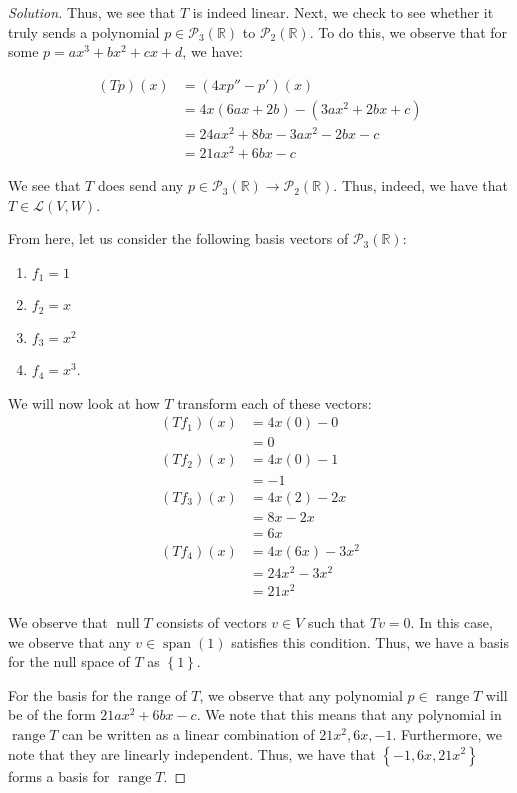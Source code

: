 \documentclass{article}
\newenvironment{solution}{\begin{proof}[Solution]}{\end{proof}}
\newcommand{\RR}{\mathbb{R}}
\DeclareMathOperator*{\vspan}{\mathrm{span}}
\DeclareMathOperator*{\vnull}{\mathrm{null}}
\DeclareMathOperator*{\vrange}{\mathrm{range}}
\begin{document}
\begin{solution}
		Thus, we see that $T$ is indeed linear. Next, we check to see whether it truly sends a polynomial $p \in \mathscr{P}_{3}(\RR)$ to $\mathscr{P}_{2}(\RR)$. To do this, we observe that for some $p = ax^{3} + bx^{2} + cx + d$, we have:
		
		\begin{align*}
			(Tp)(x) &= (4xp'' - p')(x) \\
			&= 4x(6ax + 2b) - (3ax^{2} + 2bx + c) \\
			&= 24ax^{2} + 8bx - 3ax^{2} - 2bx - c \\
			&= 21ax^{2} + 6bx - c
		\end{align*}
		
		We see that $T$ does send any $p \in \mathscr{P}_{3}(\RR) \rightarrow \mathscr{P}_{2}(\RR)$. Thus, indeed, we have that $T \in \mathcal{L}(V,W)$.
		
		From here, let us consider the following basis vectors of $\mathscr{P}_{3}(\RR)$:
		\begin{enumerate}
			\item $f_{1} = 1$
			\item $f_{2} = x$
			\item $f_{3} = x^{2}$
			\item $f_{4} = x^{3}$.
		\end{enumerate}
	
		We will now look at how $T$ transform each of these vectors:
		\begin{align*}
			(Tf_{1})(x) &= 4x(0) - 0 \\
			&= 0 \\
			(Tf_{2}) (x)&= 4x(0) - 1 \\
			&= -1 \\
			(Tf_{3}) (x)&= 4x(2) - 2x \\
			&= 8x - 2x \\
			&= 6x \\
			(Tf_{4}) (x)&= 4x(6x) - 3x^{2} \\
			&= 24x^{2} - 3x^{2} \\
			&= 21x^{2}
		\end{align*}
	
		We observe that $\vnull T$ consists of vectors $v \in V$ such that $Tv = 0$. In this case, we observe that any $v \in \vspan(1)$ satisfies this condition. Thus, we have a basis for the null space of $T$ as $\left\{  1 \right\}$.
	
		For the basis for the range of $T$, we observe that any polynomial $p \in \vrange T$ will be of the form $21ax^{2} + 6bx - c$. We note that this means that any polynomial in $\vrange T$ can be written as a linear combination of $21x^{2}, 6x, -1$. Furthermore, we note that they are linearly independent. Thus, we have that $\left\{  -1, 6x, 21x^{2}\right\}$ forms a basis for $\vrange T$.
		
		\begin{comment}
			$-1, 6x, 21x^{2}$ are all linearly independent, and thus $\left\{  -1, 6x, 21x^{2} \right\}$ is a basis for $\vrange T$.
		\end{comment}
	\end{solution}
\end{document}
